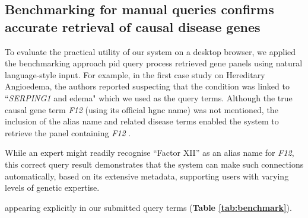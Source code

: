 \subsection{Benchmarking for manual queries confirms accurate retrieval of causal disease genes}
\noindent
To evaluate the practical utility of our system on a desktop browser, we applied the benchmarking approach \DIFdelbegin {}\DIFdelend \DIFaddbegin {}\DIFaddend \ac{pid} \DIFdelbegin {}\DIFdelend \DIFaddbegin {}\DIFaddend query process retrieved gene panels using natural language-style input. 
For example, in the first case study on Hereditary Angioedema, the authors reported suspecting that the condition was linked to ``\textit{SERPING1} \DIFdelbegin {}\DIFdelend \DIFaddbegin {}\DIFaddend and edema" which we used as the query terms. 
Although the true causal gene term \textit{F12} (using its official \ac{hgnc} name) was not mentioned, the inclusion of the alias name and \DIFdelbegin {}\DIFdelend related disease terms enabled the system to \DIFdelbegin {}\DIFdelend retrieve the panel containing \textit{F12} \DIFdelbegin {}\DIFdelend \DIFaddbegin {}\DIFaddend .

While an expert might readily recognise ``Factor XII'' as an alias name for \textit{F12}, this correct query result demonstrates that the system can make such connections automatically, based on its extensive metadata, supporting users with varying levels of genetic expertise. \DIFdelbegin {}\DIFdelend \DIFaddbegin {}

\DIFaddend appearing explicitly in \DIFdelbegin {}\DIFdelend our submitted query terms (\textbf{Table \ref{tab:benchmark}}).

